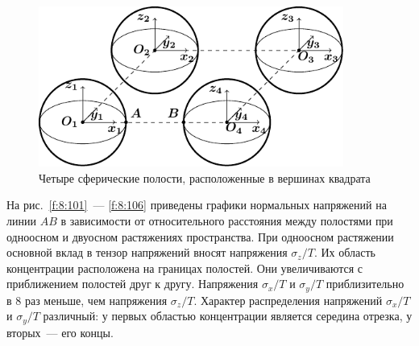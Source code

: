 \begin{figure}[h!]
\centering
\includegraphics[width=10cm]{cartesian-spheres-4.pdf}
\caption{Четыре сферические полости, расположенные в вершинах квадрата}
\label{f:8:100}
\end{figure}

На рис.~\ref{f:8:101}~--- \ref{f:8:106} приведены графики нормальных напряжений на линии $AB$ в зависимости от относительного расстояния между полостями при одноосном и двуосном растяжениях пространства. При одноосном растяжении основной вклад в тензор напряжений вносят напряжения $\sigma_z/T$. Их область концентрации расположена на границах полостей. Они увеличиваются с приближением полостей друг к другу. Напряжения $\sigma_x/T$ и $\sigma_y/T$ приблизительно в 8 раз меньше, чем напряжения $\sigma_z/T$. Характер распределения напряжений $\sigma_x/T$ и $\sigma_y/T$ различный: у первых областью концентрации является середина отрезка, у вторых~--- его концы.

